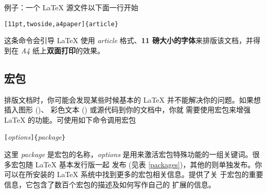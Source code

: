 
例子：一个 \LaTeX{} 源文件以下面一行开始
\begin{code}
\verb|[11pt,twoside,a4paper]{article}|
\end{code}
这条命令会引导 \LaTeX{} 使用 \emph{article} 格式、\textbf{11 磅大小的字体}来排版该文档，并得到在 \emph{A4} 纸上\textbf{双面打印}的效果。 \pagebreak[2]

\subsection{宏包}

排版文档时，你可能会发现某些时候基本的 \LaTeX{} 并不能解决你的问题。如果想插入图形 ()、
彩色文本 () 或源代码到你的文档中，你就
需要使用宏包来增强 \LaTeX{} 的功能。可使用如下命令调用宏包
\begin{lscommand}
\verb|[|\emph{options}\verb|]{|\emph{package}\verb|}|
\end{lscommand}
\noindent%
这里 \emph{package} 是宏包的名称，\emph{options} 是用来激活宏包特殊功能的一组关键词。很多宏包随 \LaTeX{} 基本发行版一起
发布 (见表 \ref{packages})，其他的则单独发布。你可以在所安装的 \LaTeX{} 系统中找到更多的宏包相关信息。\companion 提供了关
于宏包的重要信息，它包含了数百个宏包的描述及如何写作自己的 \LaTeXe{} 扩展的信息。

